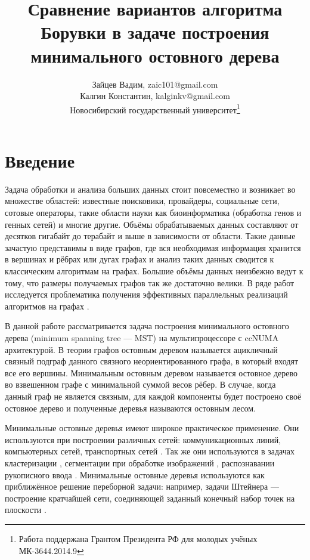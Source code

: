 \documentclass[a4paper,10pt]{extarticle}
\date{}
\title{Сравнение вариантов алгоритма Борувки в задаче построения минимального остовного дерева}
\author{Зайцев Вадим, zaic101@gmail.com \\ 
Калгин Константин, kalginkv@gmail.com \\
Новосибирский государственный университет\thanks{Работа поддержана Грантом Президента РФ для молодых учёных МК-3644.2014.9}}
\newcommand\blfootnote[1]{%
  \begingroup
  \renewcommand\thefootnote{}\footnote{#1}%
  \addtocounter{footnote}{-1}%
  \endgroup
}
\begin{document}
\maketitle
\newpage


\section*{Введение}
Задача обработки и анализа больших данных стоит повсеместно и возникает во множестве областей: известные поисковики, провайдеры, социальные сети, сотовые операторы, такие области науки как биоинформатика (обработка генов и генных сетей) \cite{graph-usage-bio} и многие другие.
Объёмы обрабатываемых данных составляют от десятков гигабайт до терабайт и выше в зависимости от области.
Такие данные зачастую представимы в виде графов, где вся необходимая информация хранится в вершинах и рёбрах или дугах графах и анализ таких данных сводится к классическим алгоритмам на графах.
Большие объёмы данных неизбежно ведут к тому, что размеры получаемых графов так же достаточно велики. В ряде работ исследуется проблематика получения эффективных параллельных реализаций алгоритмов на графах \cite{large-graph-0, large-graph-a, large-graph-b}.

В данной работе рассматривается задача построения минимального остовного дерева (minimum spanning tree --- MST) на мультипроцессоре с ccNUMA архитектурой.
В теории графов остовным деревом называется ацикличный связный подграф данного связного неориентированного  графа, в который входят все его вершины. Минимальным остовным деревом называется остовное дерево во взвешенном графе с минимальной суммой весов рёбер.
В случае, когда данный граф не является связным, для каждой компоненты будет построено своё остовное дерево и полученные деревья называются остовным лесом.

Минимальные остовные деревья имеют широкое практическое применение.
Они используются при построении различных сетей: коммуникационных линий, компьютерных сетей, транспортных сетей \cite{mst-usage-network}.
Так же они используются в задачах кластеризации \cite{mst-usage-cluster}, сегментации при обработке изображений \cite{mst-usage-image}, распознавании рукописного ввода \cite{mst-usage-handwrite}.
Минимальные остовные деревья  используются как приближённое решение переборной задачи: например, задачи Штейнера --- построение кратчайшей сети, соединяющей заданный конечный набор точек на плоскости \cite{shtree}.
\end{document}
